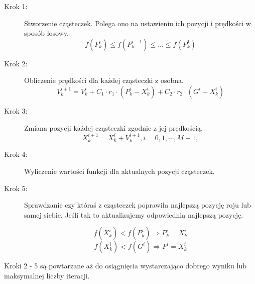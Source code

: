 \begin{description}
  \item[Krok 1:] 
     \par Stworzenie cząsteczek. Polega ono na ustawieniu ich pozycji i prędkości w sposób losowy. 
  \[f(P^{i}_{k}) \le f(P^{i-1}_{k}) \le \ldots \le f(P^{1}_{k})\]
  \item[Krok 2:]
    \par Obliczenie prędkości dla każdej cząsteczki z osobna. 
\[V^{i+1}_{k} = V^{i}_{k} + C_{1} \cdot r_{1} \cdot (P^{i}_{k} - X^{i}_{k}) + C_{2} \cdot r_{2} \cdot (G^{i} - X^{i}_{k})\]
  \item[Krok 3:]
        \par Zmiana pozycji każdej cząsteczki zgodnie z jej prędkością.
\[X^{i+1}_{k} = X^{i}_{k} + V^{i+1}_{k}, i = 0,1,\cdots, M-1,\]
  \item[Krok 4:]
        \par Wyliczenie wartości funkcji dla aktualnych pozycji cząsteczek.
  \item[Krok 5:] 
      \par Sprawdzanie czy któraś z cząsteczek poprawiła najlepszą pozycję roju lub samej siebie. Jeśli tak to aktualizujemy odpowiednią najlepszą pozycję.

    \[  f(X^{i}_{k}) < f(P^{i}_{k}) \Longrightarrow P^{i}_{k} = X^{i}_{k}\]
\[  f(X^{i}_{k}) < f(G^{i}) \Longrightarrow  P^{i} = X^{i}_{k}\]


\end{description}
    \par Kroki 2 - 5 są powtarzane aż do osiągnięcia wystarczająco dobrego wyniku lub maksymalnej liczby iteracji.
